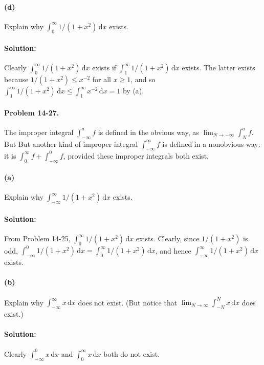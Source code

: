 \documentclass{article}
\begin{document}
\paragraph{(d)} Explain why $\int_0^{\infty} 1/(1 + x^2) \,\mathrm{d}x$ exists.

\paragraph{Solution:} Clearly $\int_0^{\infty} 1/(1 + x^2) \,\mathrm{d}x$
exists if $\int_1^{\infty} 1/(1 + x^2) \,\mathrm{d}x$ exists. The latter exists
because $1/(1 + x^2) \leq x^{-2}$ for all $x \geq 1$, and so $\int_1^{\infty}
1/(1 + x^2) \,\mathrm{d}x \leq \int_1^{\infty} x^{-2} \,\mathrm{d}x = 1$ by
(a).

\paragraph{Problem 14-27.} The improper integral $\int_{-\infty}^a f$ is
defined in the obvious way, as $\lim_{N \rightarrow -\infty} \int_N^a f$. But
But another kind of improper integral $\int_{-\infty}^{\infty} f$ is defined in
a nonobvious way: it is $\int_0^{\infty} f + \int_{-\infty}^0 f$, provided
these improper integrals both exist.

\paragraph{(a)} Explain why $\int_{-\infty}^{\infty} 1/(1 + x^2) \,\mathrm{d}x$
exists.

\paragraph{Solution:} From Problem 14-25, $\int_0^{\infty} 1/(1 + x^2)
\,\mathrm{d}x$ exists. Clearly, since $1/(1 + x^2)$ is odd, $\int_{-\infty}^0
1/(1 + x^2) \,\mathrm{d}x = \int_0^{\infty} 1/(1 + x^2) \,\mathrm{d}x$, and
hence $\int_{-\infty}^{\infty} 1/(1 + x^2) \,\mathrm{d}x$ exists.

\paragraph{(b)} Explain why $\int_{-\infty}^{\infty} x \,\mathrm{d}x$ does not
exist. (But notice that $\lim_{N \rightarrow \infty} \int_{-N}^N x
\,\mathrm{d}x$ does exist.)

\paragraph{Solution:} Clearly $\int_{-\infty}^0 x \,\mathrm{d}x$ and
$\int_0^{\infty} x \,\mathrm{d}x$ both do not exist.
\end{document}
